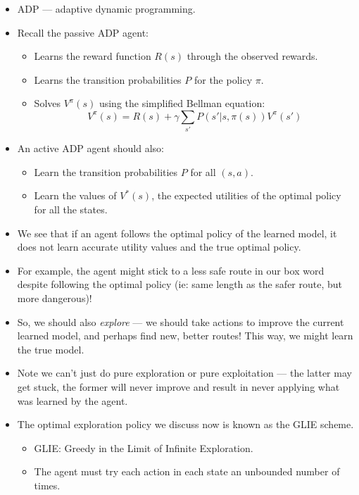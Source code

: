 \documentclass{article}
\begin{document}
\begin{itemize}
    \item ADP --- adaptive dynamic programming.
    \item Recall the passive ADP agent:
        \begin{itemize}
            \item Learns the reward function $R(s)$ through the observed rewards.
            \item Learns the transition probabilities $P$ for the policy $\pi$.
            \item Solves $V^\pi(s)$ using the simplified Bellman equation:
                \[
                    V^\pi(s) = R(s) + \gamma \sum_{s'} P(s'|s,\pi(s)) V^\pi(s')
                \]
        \end{itemize}
    \item An active ADP agent should also:
        \begin{itemize}
            \item Learn the transition probabilities $P$ for all $(s, a)$.
            \item Learn the values of $V^*(s)$, the expected utilities of the optimal policy for all the states.
        \end{itemize}
    \item We see that if an agent follows the optimal policy of the learned model, it does not learn accurate utility values and the true optimal policy.
    \item For example, the agent might stick to a less safe route in our box word despite following the optimal policy (ie: same length as the safer route, but more dangerous)!
    \item So, we should also \emph{explore} --- we should take actions to improve the current learned model, and perhaps find new, better routes!  This way, we might learn the true model.
    \item Note we can't just do pure exploration or pure exploitation --- the latter may get stuck, the former will never improve and result in never applying what was learned by the agent.
    \item The optimal exploration policy we discuss now is known as the GLIE scheme.
        \begin{itemize}
            \item GLIE: Greedy in the Limit of Infinite Exploration.
            \item The agent must try each action in each state an unbounded number of times.

\end{itemize}
\end{itemize}
\end{document}
